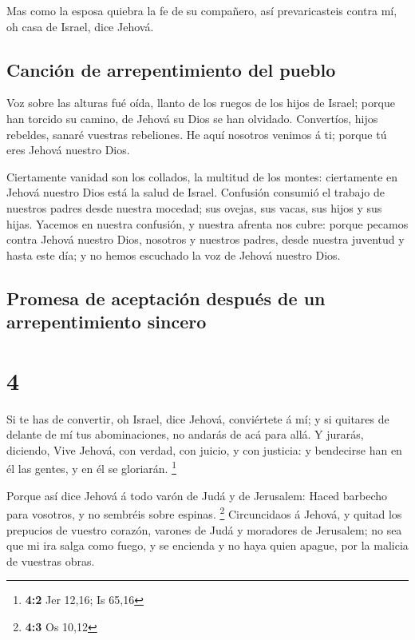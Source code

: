  Mas como la esposa quiebra la fe de su compañero, así
prevaricasteis contra mí, oh casa de Israel, dice Jehová.

\hypertarget{canciuxf3n-de-arrepentimiento-del-pueblo}{%
\subsection{Canción de arrepentimiento del
pueblo}\label{canciuxf3n-de-arrepentimiento-del-pueblo}}

 Voz sobre las alturas fué oída, llanto de los ruegos de
los hijos de Israel; porque han torcido su camino, de Jehová su Dios se
han olvidado.  Convertíos, hijos rebeldes, sanaré
vuestras rebeliones. He aquí nosotros venimos á ti; porque tú eres
Jehová nuestro Dios.

 Ciertamente vanidad son los collados, la multitud de los
montes: ciertamente en Jehová nuestro Dios está la salud de Israel.
 Confusión consumió el trabajo de nuestros padres desde
nuestra mocedad; sus ovejas, sus vacas, sus hijos y sus hijas.
 Yacemos en nuestra confusión, y nuestra afrenta nos
cubre: porque pecamos contra Jehová nuestro Dios, nosotros y nuestros
padres, desde nuestra juventud y hasta este día; y no hemos escuchado la
voz de Jehová nuestro Dios.

\hypertarget{promesa-de-aceptaciuxf3n-despuuxe9s-de-un-arrepentimiento-sincero}{%
\subsection{Promesa de aceptación después de un arrepentimiento
sincero}\label{promesa-de-aceptaciuxf3n-despuuxe9s-de-un-arrepentimiento-sincero}}

\hypertarget{section-3}{%
\section{4}\label{section-3}}

 Si te has de convertir, oh Israel, dice Jehová,
conviértete á mí; y si quitares de delante de mí tus abominaciones, no
andarás de acá para allá.  Y jurarás, diciendo, Vive
Jehová, con verdad, con juicio, y con justicia: y bendecirse han en él
las gentes, y en él se gloriarán. \footnote{\textbf{4:2} Jer 12,16; Is
  65,16}

 Porque así dice Jehová á todo varón de Judá y de
Jerusalem: Haced barbecho para vosotros, y no sembréis sobre espinas.
\footnote{\textbf{4:3} Os 10,12}  Circuncidaos á Jehová, y
quitad los prepucios de vuestro corazón, varones de Judá y moradores de
Jerusalem; no sea que mi ira salga como fuego, y se encienda y no haya
quien apague, por la malicia de vuestras obras.

